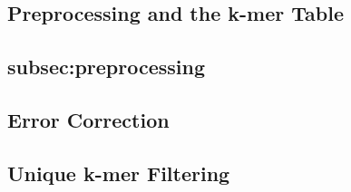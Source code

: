 \subsection{Preprocessing and the k-mer Table}
\subsection{subsec:preprocessing}

\subsection{Error Correction}
\label{subsec:error-correction}

\subsection{Unique k-mer Filtering}
\label{subsec:unique-kmer-filtering}
